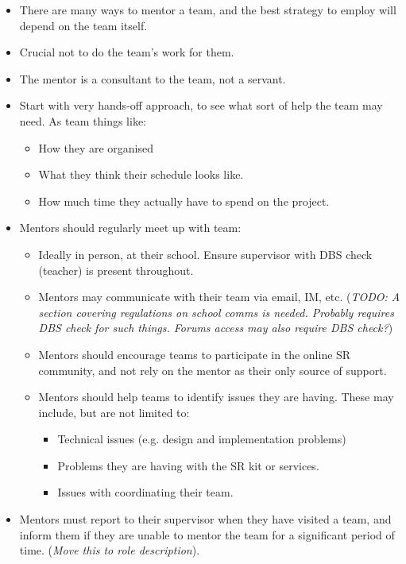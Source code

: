 \begin{itemize}
\item There are many ways to mentor a team, and the best strategy to employ will depend on the team itself.
\item Crucial not to do the team's work for them.
\item The mentor is a consultant to the team, not a servant.
\item Start with very hands-off approach, to see what sort of help the team may need.  As team things like:
  \begin{itemize}
  \item How they are organised
  \item What they think their schedule looks like.
  \item How much time they actually have to spend on the project.
  \end{itemize}
\item Mentors should regularly meet up with team:
  \begin{itemize}
  \item Ideally in person, at their school.  Ensure supervisor with DBS check (teacher) is present throughout.
  \item Mentors may communicate with their team via email, IM, etc. (\textit{TODO: A section covering regulations on school comms is needed.  Probably requires DBS check for such things.  Forums access may also require DBS check?})

  \item Mentors should encourage teams to participate in the online SR community, and not rely on the mentor as their only source of support.

  \item Mentors should help teams to identify issues they are having.  These may include, but are not limited to:
    \begin{itemize}
    \item Technical issues (e.g. design and implementation problems)
    \item Problems they are having with the SR kit or services.
    \item Issues with coordinating their team.
    \end{itemize}
  \end{itemize}

\item Mentors must report to their supervisor when they have visited a team, and inform them if they are unable to mentor the team for a significant period of time. (\textit{Move this to role description}).


\end{itemize}
